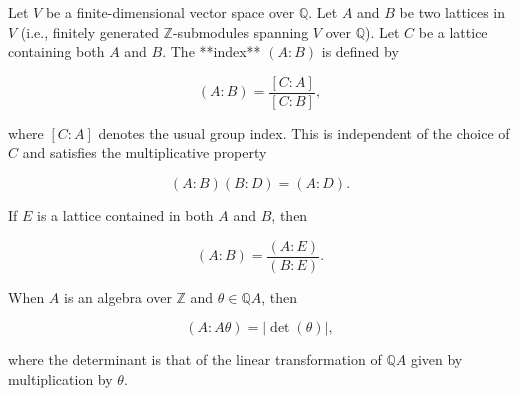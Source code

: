 Let $V$ be a finite-dimensional vector space over $\mathbb{Q}$. Let $A$ and $B$ be two lattices in $V$ (i.e., finitely generated $\mathbb{Z}$-submodules spanning $V$ over $\mathbb{Q}$). Let $C$ be a lattice containing both $A$ and $B$. The **index** $(A : B)$ is defined by

$$
(A : B) = \frac{[C : A]}{[C : B]},
$$

where $[C : A]$ denotes the usual group index. This is independent of the choice of $C$ and satisfies the multiplicative property

$$
(A : B)(B : D) = (A : D).
$$

If $E$ is a lattice contained in both $A$ and $B$, then

$$
(A : B) = \frac{(A : E)}{(B : E)}.
$$

When $A$ is an algebra over $\mathbb{Z}$ and $\theta \in \mathbb{Q}A$, then

$$
(A : A\theta) = \lvert\det(\theta)\rvert,
$$

where the determinant is that of the linear transformation of $\mathbb{Q}A$ given by multiplication by $\theta$.
